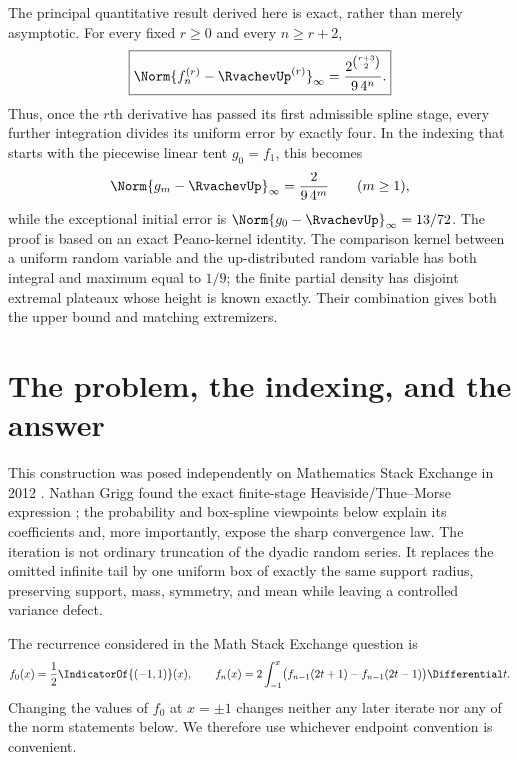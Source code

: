 \documentclass[11pt,oneside]{article}
\theoremstyle{definition}
\theoremstyle{remark}
\begin{document}
The principal quantitative result derived here is exact, rather than merely asymptotic.  For every
fixed $r\ge0$ and every $n\ge r+2$,
\[
 \boxed{\displaystyle
 \Norm{f_n^{(r)}-\RvachevUp^{(r)}}_\infty
 =\frac{2^{\binom{r+3}{2}}}{9\,4^n}.}
\]
Thus, once the $r$th derivative has passed its first admissible spline stage, every further
integration divides its uniform error by exactly four.  In the indexing that starts with the
piecewise linear tent $g_0=f_1$, this becomes
\[
 \Norm{g_m-\RvachevUp}_\infty=\frac{2}{9\,4^m}\qquad(m\ge1),
\]
while the exceptional initial error is $\Norm{g_0-\RvachevUp}_\infty=13/72$.
The proof is based on an exact Peano-kernel identity.  The comparison kernel between a
uniform random variable and the up-distributed random variable has both integral and
maximum equal to $1/9$; the finite partial density has disjoint extremal plateaux whose
height is known exactly.  Their combination gives both the upper bound and matching
extremizers.


\section{The problem, the indexing, and the answer}
\label{repeated2:sec:introduction}

This construction was posed independently on Mathematics Stack Exchange in 2012
\cite{repeated2:mse-question}.  Nathan Grigg found the exact finite-stage
Heaviside/Thue--Morse expression \cite{repeated2:mse-answer}; the probability and
box-spline viewpoints below explain its coefficients and, more importantly, expose the
sharp convergence law.  The iteration is not ordinary truncation of the dyadic random
series.  It replaces the omitted infinite tail by one uniform box of exactly the same
support radius, preserving support, mass, symmetry, and mean while leaving a controlled
variance defect.

The recurrence considered in the Math Stack Exchange question
\cite{repeated2:mse-question,repeated2:mse-answer} is
\begin{equation}
 f_0(x)=\frac12\IndicatorOf{(-1,1)}(x),
 \qquad
 f_n(x)=2\int_{-1}^{x}
 \bigl(f_{n-1}(2t+1)-f_{n-1}(2t-1)\bigr)\Differential t.
 \label{repeated2:eq:original-recurrence}
\end{equation}
Changing the values of $f_0$ at $x=\pm1$ changes neither any later iterate nor any of the
norm statements below.  We therefore use whichever endpoint convention is convenient.
\end{document}
